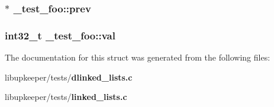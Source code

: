 \subsubsection[{prev}]{$\ast$ {\bf \_\-test\_\-foo::prev}}\label{struct__test__foo_aa19f104ddf0ba576b20be046d60fb969}
\subsubsection[{val}]{\setlength{\rightskip}{0pt plus 5cm}int32\_\-t {\bf \_\-test\_\-foo::val}}\label{struct__test__foo_a6a79e2f1515c1ef1901602ebbb025044}


The documentation for this struct was generated from the following files:\begin{DoxyCompactItemize}
\item 
libupkeeper/tests/{\bf dlinked\_\-lists.c}\item 
libupkeeper/tests/{\bf linked\_\-lists.c}\end{DoxyCompactItemize}
